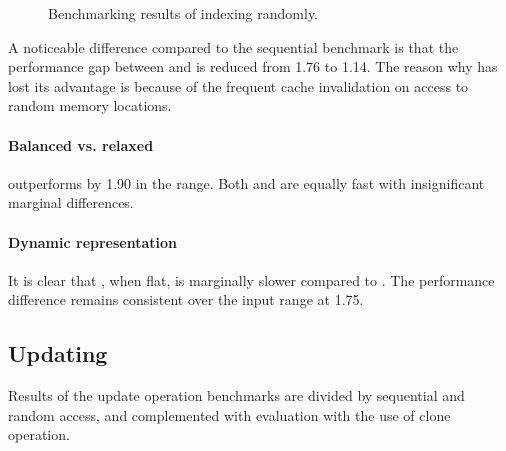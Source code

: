 \begin{figure}[t]

    \caption{Benchmarking results of indexing randomly.}
    \label{fig:index-randomly}
\end{figure}

A noticeable difference compared to the sequential benchmark is that the performance gap between \pvec{} and \stdvec{} is reduced from 1.76 to 1.14. The reason why \stdvec{} has lost its advantage is because of the frequent cache invalidation on access to random memory locations.

\paragraph{Balanced vs. relaxed}
\rbvec{} outperforms \rrbvec{} by 1.90 in the \range{[100, \mega{1}]} range. Both \rrbvec{} and \imrsvec{} are equally fast with insignificant marginal differences.

\paragraph{Dynamic representation}
It is clear that \pvec{}, when flat, is marginally slower compared to \stdvec{}. The performance difference remains consistent over the input range at 1.75.

\subsection{Updating}
Results of the update operation benchmarks are divided by sequential and random access, and complemented with evaluation with the use of clone operation.


